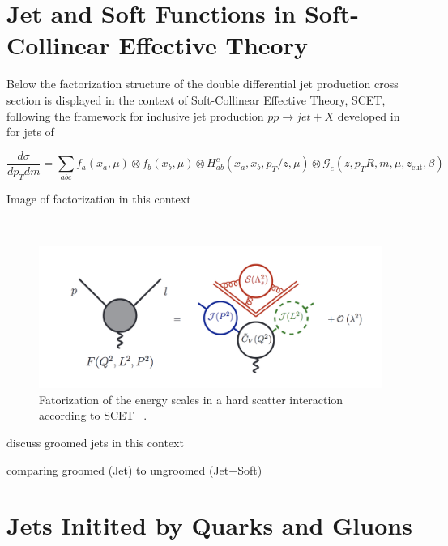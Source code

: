 

\section{Jet and Soft Functions in Soft-Collinear Effective Theory}

Below the factorization structure of the double differential jet production cross section is displayed in the context of Soft-Collinear Effective Theory, SCET, following the framework for inclusive jet production $pp \rightarrow jet + X$ developed in for jets of  %

\begin{equation}
\frac{d \sigma}{ d p_{T} d m}=\sum_{a b c} f_{a}\left(x_{a}, \mu\right) \otimes f_{b}\left(x_{b}, \mu\right) \otimes H_{a b}^{c}\left(x_{a}, x_{b}, p_{T} / z, \mu\right) \otimes \mathcal{G}_{c}\left(z, p_{T} R, m, \mu, z_{\mathrm{cut}}, \beta\right)
\end{equation}



Image of factorization in this context

~\cite{Becher:2014oda}
\begin{figure}[htb]
\centering
\includegraphics[width=1.0\textwidth]{visuals/SCET-factorization.png}
\caption{Fatorization of the energy scales in a hard scatter interaction according to SCET ~\cite{Becher:2014oda}.}
\label{fig:scet}
\end{figure}
discuss groomed jets in this context

comparing groomed  (Jet) to ungroomed (Jet+Soft)

\section{Jets Initited by Quarks and Gluons }\label{jetgroom:ch1}



